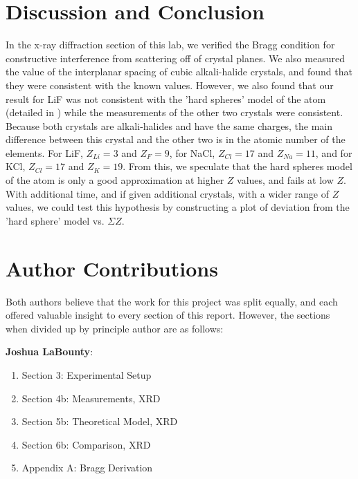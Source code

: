\documentclass[%
 reprint,
 amsmath,amssymb,
 aps,
 pra,
]{revtex4-1}
\begin{document}
\section{Discussion and Conclusion}

In the x-ray diffraction section of this lab, we verified the Bragg condition for constructive interference from scattering off of crystal planes. We also measured the value of the interplanar spacing of cubic alkali-halide crystals, and found that they were consistent with the known values. However, we also found that our result for LiF was not consistent with the 'hard spheres' model of the atom (detailed in \cite{hard_sphere, hard_sphere2}) while the measurements of the other two crystals were consistent. Because both crystals are alkali-halides and have the same charges, the main difference between this crystal and the other two is in the atomic number of the elements. For LiF, $Z_{Li} = 3$ and $Z_{F} = 9$, for NaCl, $Z_{Cl} = 17$ and $Z_{Na} = 11$, and for KCl, $Z_{Cl} = 17$ and $Z_{K} = 19$. From this, we speculate that the hard spheres model of the atom is only a good approximation at higher $Z$ values, and fails at low $Z$. With additional time, and if given additional crystals, with a wider range of $Z$ values, we could test this hypothesis by constructing a plot of deviation from the 'hard sphere' model vs. $\Sigma Z$.

\section{Author Contributions}

Both authors believe that the work for this project was split equally, and each offered valuable insight to every section of this report. However, the sections when divided up by principle author are as follows:

\noindent \textbf{Joshua LaBounty}:
\begin{enumerate}
	\item Section 3: Experimental Setup
	\item Section 4b: Measurements, XRD
	\item Section 5b: Theoretical Model, XRD
	\item Section 6b: Comparison, XRD
	\item Appendix A: Bragg Derivation
\end{enumerate}
\end{document}
